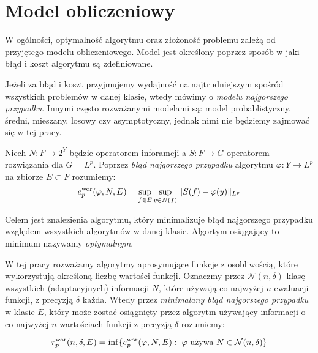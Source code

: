 \documentclass[oik, pdftex, robocza, man]{mgrwms}
\begin{document}


\section{Model obliczeniowy}


    W ogólności, optymalność algorytmu oraz złożoność problemu zależą od przyjętego modelu obliczeniowego. Model jest określony poprzez sposób w jaki błąd i koszt algorytmu są zdefiniowane. 
    
    Jeżeli za błąd i koszt przyjmujemy wydajność na najtrudniejszym spośród wszystkich problemów w danej klasie, wtedy mówimy o \textit{modelu najgorszego przypadku}. Innymi często rozważanymi modelami są: model probablistyczny, średni, mieszany, losowy czy asymptotyczny, jednak nimi nie będziemy zajmować się w tej pracy.

    Niech $N : F \rightarrow 2^{Y}$ będzie operatorem inforamcji a $S: F \rightarrow G$ operatorem rozwiązania dla $G=L^{p}$. Poprzez \textit{błąd najgorszego przypadku} algorytmu $\varphi : Y \rightarrow L^{p}$ na zbiorze $E \subset F$ rozumiemy:
    \begin{equation*}
        e_{p}^{\mathrm{wor}}(\varphi, N, E) = \sup_{f \in E} \sup_{y \in N(f)} \|S(f) - \varphi(y) \|_{L^{p}}
    \end{equation*}

    Celem jest znalezienia algorytmu, który minimalizuje błąd najgorszego przypadku względem wszystkich algorytmów w danej klasie. Algortym osiągający to minimum nazywamy \textit{optymalnym}.

    W tej pracy rozważamy algorytmy aprosymujące funkcje z osobliwością, które wykorzystują określoną liczbę wartości funkcji. Oznaczmy przez $\mathcal{N}(n, \delta)$ klasę wszystkich (adaptacyjnych) informacji $N$, które używają co najwyżej $n$ ewaluacji funkcji, z precyzją $\delta$ każda. Wtedy przez \textit{minimalany błąd najgorszego przypadku} w klasie $E$, który może zostać osiągnięty przez algorytm używający informacji o co najwyżej $n$ wartościach funkcji z precyzją $\delta$ rozumiemy:

    \begin{equation*}
        r^{\mathrm{wor}}_{p}(n, \delta, E) = \inf\{ e_{p}^{\mathrm{wor}}(\varphi, N, E) : \; \varphi \text{ używa } N \in \mathcal{N}(n, \delta) \}
    \end{equation*}
\end{document}
